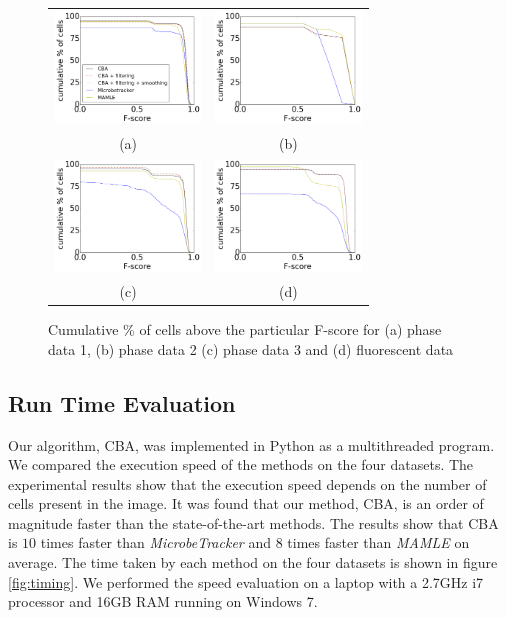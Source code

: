 \documentclass[journal]{IEEEtran}
\begin{document}
\begin{figure}[!h]
	\centering
	\begin{tabular}{c c }
		\includegraphics[height=3cm]{phasdat1fscorecumul.png} & \includegraphics[height=3cm]{phasdat2fscorecumul.png} \\
		(a) & (b)\\
		\includegraphics[height=3cm]{phasdat3fscorecumul.png} &
		\includegraphics[height=3cm]{fluofscorecumul.png}\\
		(c) & (d)
	\end{tabular}
	\caption{Cumulative \% of cells above the particular F-score for (a) phase data 1, (b) phase data 2 (c) phase data 3 and (d) fluorescent data }
	\label{fig:fscorecumul}
	
\end{figure}




\subsection{Run Time Evaluation}
Our algorithm, CBA, was implemented in Python as a multithreaded program. We compared the execution speed of the methods on the four datasets. The experimental results show that the execution speed depends on the number of cells present in the image. It was found that our method, CBA, is an order of magnitude faster than the state-of-the-art methods. The results show that CBA is $10$ times faster than \textit{MicrobeTracker} and $8$ times faster than \textit{MAMLE} on average. The time taken by each method on the four datasets is shown in figure \ref{fig:timing}. We performed the speed evaluation on a laptop with a 2.7GHz i7 processor and 16GB RAM running on Windows 7.
\end{document}

